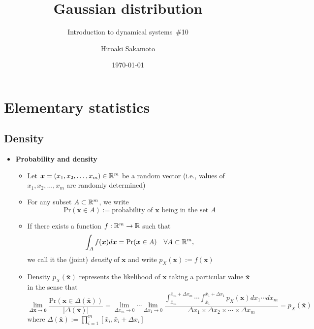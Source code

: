 \documentclass[12pt,a4paper]{article}
\title{Gaussian distribution}
\subtitle{Introduction to dynamical systems~\#10}
\author{Hiroaki Sakamoto}
\date{\today}
\begin{document}
\maketitle
\tableofcontents

\section{Elementary statistics}

\subsection{Density}

\begin{itemize}

\item \textbf{Probability and density}
  \begin{itemize}
  \item Let $\bm{x} = (x_{1},x_{2},\ldots, x_{m})\in \mathbb{R}^{m}$ be a random vector (i.e., values of $x_{1}, x_{2},\ldots, x_{m}$ are randomly determined)
  \item For any subset $A\subset \mathbb{R}^{m}$,
    we write
    \begin{equation}\nonumber%
      \text{Pr}(\bm{x}\in A) := \text{probability of $\bm{x}$ being in the set $A$}
    \end{equation}
  \item If there exists a function $f:\mathbb{R}^{m}\to \mathbb{R}$ such that
    \begin{equation}\nonumber%
      \int_{A}f(\bm{x})d\bm{x}
      =
      \text{Pr}(\bm{x}\in A)
      \quad \forall A\subset \R^{m},
    \end{equation}
    we call it the (joint) \emph{density} of $\bm{x}$
    and write $p_{X}(\bm{x}):=f(\bm{x})$
  \item Density $p_{X}(\bar{\bm{x}})$
    represents the likelihood of $\bm{x}$ taking a particular value $\bar{\bm{x}}$
    in the sense that
    \begin{equation}
      \lim_{\Delta \bm{x} \to \bm{0}}\frac{\text{Pr}(\bm{x}\in \Delta(\bar{\bm{x}}))}{|\Delta(\bar{\bm{x}})|}
      =
      \lim_{\Delta x_{m} \to 0}\cdots \lim_{\Delta x_{1} \to 0}\frac{\int_{\bar{x}_{m}}^{\bar{x}_{m}+\Delta x_{m}}\cdots \int_{\bar{x}_{1}}^{\bar{x}_{1}+\Delta x_{1}}p_{X}(\bm{x})dx_{1}\cdots dx_{m}}{\Delta x_{1}\times \Delta x_{2}\times \cdots \times\Delta x_{m}}
      = p_{X}(\bar{\bm{x}})
    \nonumber%
    \end{equation}
    where $\Delta(\bar{\bm{x}}) := \prod_{i=1}^{m}[\bar{x}_{i}, \bar{x}_{i}+\Delta x_{i}]$
  \end{itemize}


\end{itemize}
\end{document}
